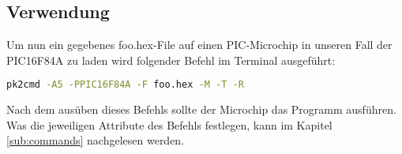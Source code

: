\subsection{Verwendung}
\label{sub:howToUse}
Um nun ein gegebenes {\ttfamily foo.hex}-File auf einen PIC-Microchip in unseren Fall der PIC16F84A zu laden wird folgender Befehl im Terminal ausgeführt:
\begin{lstlisting}[language=bash]
                pk2cmd -A5 -PPIC16F84A -F foo.hex -M -T -R
\end{lstlisting}
Nach dem ausüben dieses Befehls sollte der Microchip das Programm ausführen. Was die jeweiligen Attribute des Befehls festlegen, kann im Kapitel \ref{sub:commands} nachgelesen werden.